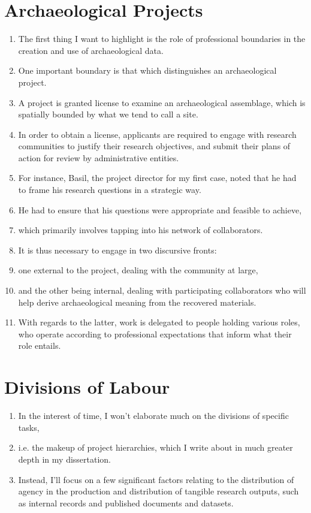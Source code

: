 \documentclass[12pt]{article}
\begin{document}
\section{Archaeological Projects}
\begin{enumerate}
  \item The first thing I want to highlight is the role of professional boundaries in the creation and use of archaeological data.
  \item One important boundary is that which distinguishes an archaeological project.
  \item A project is granted license to examine an archaeological assemblage, which is spatially bounded by what we tend to call a site.
  \item In order to obtain a license, applicants are required to engage with research communities to justify their research objectives, and submit their plans of action for review by administrative entities.
  \item For instance, Basil, the project director for my first case, noted that he had to frame his research questions in a strategic way.
  \item He had to ensure that his questions were appropriate and feasible to achieve,
  \item which primarily involves tapping into his network of collaborators.
  \item It is thus necessary to engage in two discursive fronts:
  \item one external to the project, dealing with the community at large,
  \item and the other being internal, dealing with participating collaborators who will help derive archaeological meaning from the recovered materials.
  \item With regards to the latter, work is delegated to people holding various roles, who operate according to professional expectations that inform what their role entails.

\end{enumerate}

\section{Divisions of Labour}
\begin{enumerate}
  \item In the interest of time, I won't elaborate much on the divisions of specific tasks,
  \item i.e. the makeup of project hierarchies, which I write about in much greater depth in my dissertation.
  \item Instead, I'll focus on a few significant factors relating to the distribution of agency in the production and distribution of tangible research outputs, such as internal records and published documents and datasets.
\end{enumerate}
  
\end{document}
